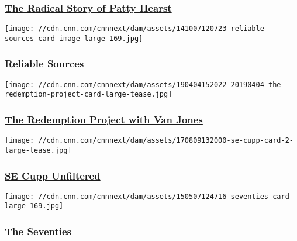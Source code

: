 \hypertarget{the-radical-story-of-patty-hearst}{%
\subsubsection{\texorpdfstring{\href{/shows/radical-story-patty-hearst}{The
Radical Story of Patty
Hearst}}{The Radical Story of Patty Hearst}}\label{the-radical-story-of-patty-hearst}}

\href{/shows/reliable-sources}{}

\texttt{[image: //cdn.cnn.com/cnnnext/dam/assets/141007120723-reliable-sources-card-image-large-169.jpg]}

\hypertarget{reliable-sources}{%
\subsubsection{\texorpdfstring{\href{/shows/reliable-sources}{Reliable
Sources}}{Reliable Sources}}\label{reliable-sources}}

\href{/shows/redemption-project-van-jones}{}

\texttt{[image: //cdn.cnn.com/cnnnext/dam/assets/190404152022-20190404-the-redemption-project-card-large-tease.jpg]}

\hypertarget{the-redemption-project-with-van-jones}{%
\subsubsection{\texorpdfstring{\href{/shows/redemption-project-van-jones}{The
Redemption Project with Van
Jones}}{The Redemption Project with Van Jones}}\label{the-redemption-project-with-van-jones}}

\href{/shows/se-cupp}{}

\texttt{[image: //cdn.cnn.com/cnnnext/dam/assets/170809132000-se-cupp-card-2-large-tease.jpg]}

\hypertarget{se-cupp-unfiltered}{%
\subsubsection{\texorpdfstring{\href{/shows/se-cupp}{SE Cupp
Unfiltered}}{SE Cupp Unfiltered}}\label{se-cupp-unfiltered}}

\href{/shows/the-seventies}{}

\texttt{[image: //cdn.cnn.com/cnnnext/dam/assets/150507124716-seventies-card-large-169.jpg]}

\hypertarget{the-seventies}{%
\subsubsection{\texorpdfstring{\href{/shows/the-seventies}{The
Seventies}}{The Seventies}}\label{the-seventies}}

